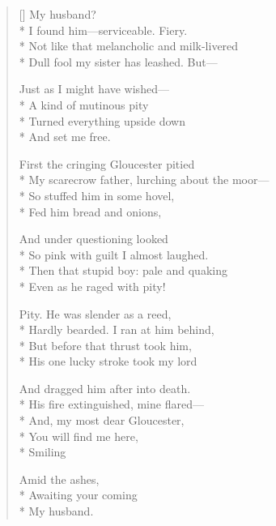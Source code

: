 \label{ch:lear_ao}
\settowidth{\versewidth}{My scarecrow father, lurching about the moor---}
\begin{verse}[\versewidth]
My husband?\\*
I found him---serviceable. Fiery.\\*
Not like that melancholic and milk-livered\\*
Dull fool my sister has leashed. But---

Just as I might have wished---\\*
A kind of mutinous pity\\*
Turned everything upside down\\*
And set me free.

First the cringing Gloucester pitied\\*
My scarecrow father, lurching about the moor---\\*
So stuffed him in some hovel,\\*
Fed him bread and onions,

And under questioning looked\\*
So pink with guilt I almost laughed.\\*
Then that stupid boy: pale and quaking\\*
Even as he raged with pity!

Pity.  He was slender as a reed,\\*
Hardly bearded. I ran at him behind,\\*
But before that thrust took him,\\*
His one lucky stroke took my lord

And dragged him after into death.\\*
His fire extinguished, mine flared---\\*
And, my most dear Gloucester,\\*
You will find me here,\\*
\qquad \qquad \qquad Smiling

Amid the ashes,\\*
\qquad \qquad Awaiting your coming\\*
My husband.
\end{verse}
